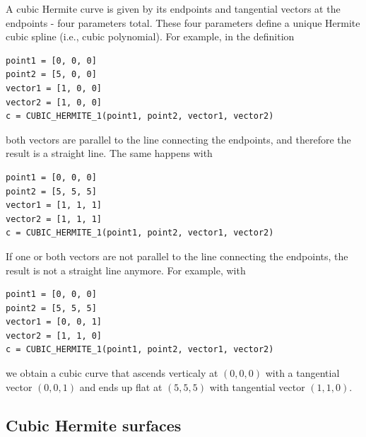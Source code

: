A cubic Hermite curve is given by its 
endpoints and tangential vectors at the 
endpoints - four parameters total. These four parameters 
define a unique Hermite cubic spline (i.e., cubic polynomial). 
For example, in the definition\\

\begin{bbox}
\begin{verbatim}
point1 = [0, 0, 0]
point2 = [5, 0, 0]
vector1 = [1, 0, 0]
vector2 = [1, 0, 0]
c = CUBIC_HERMITE_1(point1, point2, vector1, vector2)
\end{verbatim}
\end{bbox}
\vspace{6mm}

\noindent
both vectors are parallel to the line connecting the endpoints,
and therefore the result is a straight line. The same happens 
with  \\

\begin{bbox}
\begin{verbatim}
point1 = [0, 0, 0]
point2 = [5, 5, 5]
vector1 = [1, 1, 1]
vector2 = [1, 1, 1]
c = CUBIC_HERMITE_1(point1, point2, vector1, vector2)
\end{verbatim}
\end{bbox}
\vspace{6mm}

\noindent
If one or both vectors are not parallel to the line connecting 
the endpoints, the result is not a straight line anymore. 
For example, with \\
 
\begin{bbox}
\begin{verbatim}
point1 = [0, 0, 0]
point2 = [5, 5, 5]
vector1 = [0, 0, 1]
vector2 = [1, 1, 0]
c = CUBIC_HERMITE_1(point1, point2, vector1, vector2)
\end{verbatim}
\end{bbox}
\vspace{6mm}

\noindent
we obtain a cubic curve that ascends verticaly at $(0, 0, 0)$ with
a tangential vector $(0, 0, 1)$ and ends up flat at $(5, 5, 5)$ with 
tangential vector $(1, 1, 0)$.

\subsection{Cubic Hermite surfaces}

